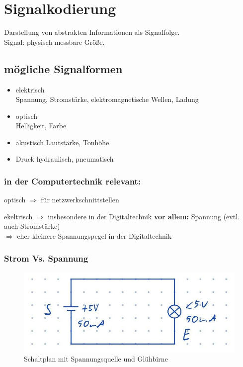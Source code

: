 \documentclass[10pt,a4paper]{scrartcl}
\begin{document}
\section{Signalkodierung}

\begin{Theorem}{}{}
	Darstellung von abstrakten Informationen als Signalfolge. \\
	Signal: physisch messbare Größe.
\end{Theorem}

\subsection{mögliche Signalformen}
\begin{itemize}
	\renewcommand\labelitemi{--}
	
	\item elektrisch\\
		Spannung, Stromstärke, elektromagnetische Wellen, Ladung
	\item optisch\\
		Helligkeit, Farbe
	\item akustisch
		Lautstärke, Tonhöhe
	\item Druck
		hydraulisch, pneumatisch
\end{itemize}

\subsubsection*{in der Computertechnik relevant:}

\begin{list}{}{}
	\item[] optisch $\Rightarrow$ für netzwerkschnittstellen
	\item ekeltrisch $\Rightarrow$ insbesondere in der Digitaltechnik
	\subitem \textbf{vor allem:} Spannung (evtl. auch Stromstärke)\\
	\hspace*{2em}$\Rightarrow$ eher kleinere Spannungspegel in der Digitaltechnik
\end{list}

\subsubsection*{Strom Vs. Spannung}
\begin{figure}
	\centering
	\includegraphics[width=0.5\linewidth]{img/strom_spannung_signale}
	\caption{Schaltplan mit Spannungsquelle und Glühbirne}
	\label{abb:schaltplan}
\end{figure}
\end{document}

